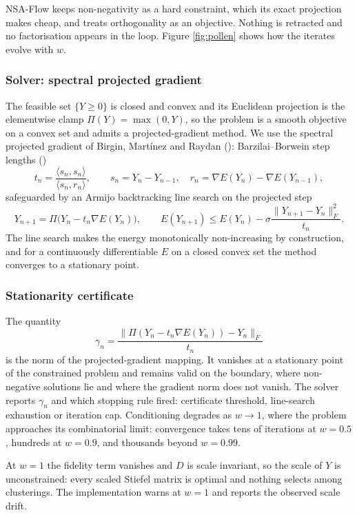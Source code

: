 \documentclass[
]{article}
\begin{document}
NSA-Flow keeps non-negativity as a hard constraint, which its exact projection makes cheap, and treats orthogonality as an objective. Nothing is retracted and no factorisation appears in the loop. Figure \ref{fig:pollen} shows how the iterates evolve with \(w\).

\subsubsection{Solver: spectral projected gradient}\label{solver-spectral-projected-gradient}

The feasible set \(\{ Y \ge 0 \}\) is closed and convex and its Euclidean projection is the elementwise clamp \(\Pi(Y) = \max(0, Y)\), so the problem is a smooth objective on a convex set and admits a projected-gradient method. We use the spectral projected gradient of Birgin, Martínez and Raydan (): Barzilai--Borwein step lengths ()
\[
t_n = \frac{\langle s_n, s_n\rangle}{\langle s_n, r_n\rangle},
\qquad s_n = Y_n - Y_{n-1},\quad r_n = \nabla E(Y_n) - \nabla E(Y_{n-1}),
\]
safeguarded by an Armijo backtracking line search on the projected step
\[
Y_{n+1} = \Pi\big(Y_n - t_n \nabla E(Y_n)\big),
\qquad
E(Y_{n+1}) \le E(Y_n) - \sigma \frac{\|Y_{n+1} - Y_n\|_F^2}{t_n}.
\]
The line search makes the energy monotonically non-increasing by construction, and for a continuously differentiable \(E\) on a closed convex set the method converges to a stationary point.

\subsubsection{Stationarity certificate}\label{stationarity-certificate}

The quantity
\[
\gamma_n = \frac{\|\Pi(Y_n - t_n \nabla E(Y_n)) - Y_n\|_F}{t_n}
\]
is the norm of the projected-gradient mapping. It vanishes at a stationary point of the constrained problem and remains valid on the boundary, where non-negative solutions lie and where the gradient norm does not vanish. The solver reports \(\gamma_n\) and which stopping rule fired: certificate threshold, line-search exhaustion or iteration cap. Conditioning degrades as \(w \to 1\), where the problem approaches its combinatorial limit: convergence takes tens of iterations at \(w = 0.5\), hundreds at \(w = 0.9\), and thousands beyond \(w = 0.99\).

At \(w = 1\) the fidelity term vanishes and \(D\) is scale invariant, so the scale of \(Y\) is unconstrained: every scaled Stiefel matrix is optimal and nothing selects among clusterings. The implementation warns at \(w = 1\) and reports the observed scale drift.
\end{document}
